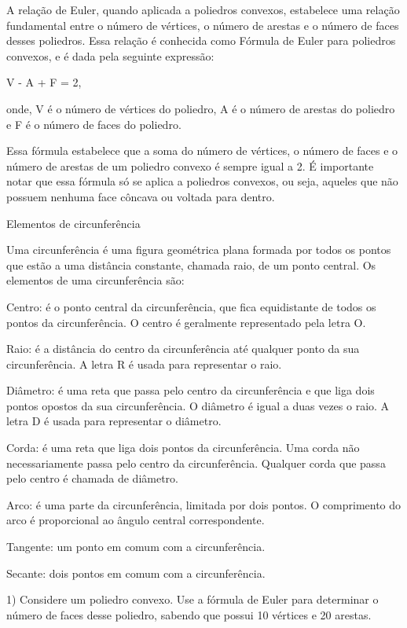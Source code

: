 A relação de Euler, quando aplicada a poliedros convexos, estabelece uma
relação fundamental entre o número de vértices, o número de arestas e o
número de faces desses poliedros. Essa relação é conhecida como Fórmula
de Euler para poliedros convexos, e é dada pela seguinte expressão:

V - A + F = 2,

onde, V é o número de vértices do poliedro, A é o número de arestas do
poliedro e F é o número de faces do poliedro.

Essa fórmula estabelece que a soma do número de vértices, o número de
faces e o número de arestas de um poliedro convexo é sempre igual a 2. É
importante notar que essa fórmula só se aplica a poliedros convexos, ou
seja, aqueles que não possuem nenhuma face côncava ou voltada para
dentro.

Elementos de circunferência

Uma circunferência é uma figura geométrica plana formada por todos os
pontos que estão a uma distância constante, chamada raio, de um ponto
central. Os elementos de uma circunferência são:

Centro: é o ponto central da circunferência, que fica equidistante de
todos os pontos da circunferência. O centro é geralmente representado
pela letra O.

Raio: é a distância do centro da circunferência até qualquer ponto da
sua circunferência. A letra R é usada para representar o raio.

Diâmetro: é uma reta que passa pelo centro da circunferência e que liga
dois pontos opostos da sua circunferência. O diâmetro é igual a duas
vezes o raio. A letra D é usada para representar o diâmetro.

Corda: é uma reta que liga dois pontos da circunferência. Uma corda não
necessariamente passa pelo centro da circunferência. Qualquer corda que
passa pelo centro é chamada de diâmetro.

Arco: é uma parte da circunferência, limitada por dois pontos. O
comprimento do arco é proporcional ao ângulo central correspondente.

Tangente: um ponto em comum com a circunferência.

Secante: dois pontos em comum com a circunferência.


1) Considere um poliedro convexo. Use a fórmula de Euler para determinar
o número de faces desse poliedro, sabendo que possui 10 vértices e 20
arestas.

